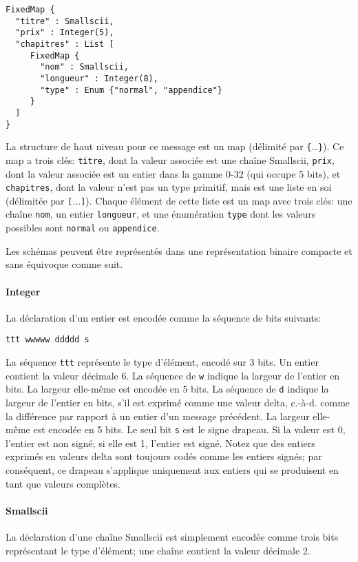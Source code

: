 \begin{verbatim}
FixedMap {
  "titre" : Smallscii,
  "prix" : Integer(5),
  "chapitres" : List [
     FixedMap {
       "nom" : Smallscii,
       "longueur" : Integer(8),
       "type" : Enum {"normal", "appendice"}
     }
  ]
}
\end{verbatim}

La structure de haut niveau pour ce message est un map (délimité par \verb+{+\dots\verb+}+). Ce map a trois clés: \verb+titre+, dont la valeur associée est une chaîne Smallscii, \verb+prix+, dont la valeur associée est un entier dans la gamme 0-32 (qui occupe 5 bits), et \verb+chapitres+, dont la valeur n'est pas un type primitif, mais est une liste en soi (délimitée par \verb+[+...\verb+]+). Chaque élément de cette liste est un map avec trois clés: une chaîne \verb+nom+, un entier \verb+longueur+, et une énumération \verb+type+ dont les valeurs possibles sont \verb+normal+ ou \verb+appendice+.

Les schémas peuvent être représentés dans une représentation binaire compacte et sans équivoque comme suit.

\paragraph{Integer} La déclaration d'un entier est encodée comme la séquence de bits suivants:
%
\begin{verbatim}
ttt wwwww ddddd s
\end{verbatim}

La séquence \verb+ttt+ représente le type d'élément, encodé sur 3 bits. Un entier contient la valeur décimale 6. La séquence de \verb+w+ indique la largeur de l'entier en bits. La largeur elle-même est encodée en 5 bits. La séquence de \verb+d+ indique la largeur de l'entier en bits, s'il est exprimé comme une valeur delta, c.-à-d. comme la différence par rapport à un entier d'un message précédent. La largeur elle-même est encodée en 5 bits. Le seul bit \verb+s+ est le signe drapeau. Si la valeur est 0, l'entier est non signé; si elle est 1, l'entier est signé. Notez que des entiers exprimés en valeurs delta sont toujours codés comme les entiers signés; par conséquent, ce drapeau s'applique uniquement aux entiers qui se produisent en tant que valeurs complètes.

\paragraph{Smallscii} La déclaration d'une chaîne Smallscii est simplement encodée comme trois bits représentant le type d'élément; une chaîne contient la valeur décimale 2.

